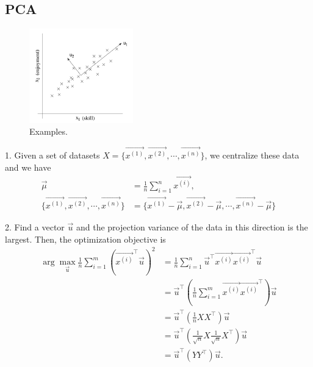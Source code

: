 \documentclass[10pt,onecolumn]{book}
\begin{document}
\subsection{PCA}
\begin{figure}[h]
\centering
\includegraphics[width=0.4\textwidth]{figures/pca_variance.png}
\caption{Examples.}
\end{figure}

1. Given a set of datasets $X = \{\overrightarrow{x^{(1)}}, \overrightarrow{x^{(2)}}, \cdots, \overrightarrow{x^{(n)}} \}$, we centralize these data and we have
\begin{equation}
\begin{split}
\overrightarrow{\mu} &= \frac{1}{n} \sum_{i=1}^n \overrightarrow{x^{(i)}}, \\
\{\overrightarrow{x^{(1)}}, \overrightarrow{x^{(2)}}, \cdots, \overrightarrow{x^{(n)}} \} &= \{\overrightarrow{x^{(1)}} - \overrightarrow{\mu}, \overrightarrow{x^{(2)}} - \overrightarrow{\mu}, \cdots, \overrightarrow{x^{(n)}}-\overrightarrow{\mu} \}
\end{split}
\end{equation}

2. Find a vector $\vec{u}$ and the projection variance of the data in this direction is the largest. Then, the optimization objective is
\begin{equation}
\begin{split}
\arg \max_{\vec{u}} \frac{1}{n}\sum_{i=1}^m (\overrightarrow{x^{(i)}}^\top \vec{u})^2 &= \frac{1}{n} \sum_{i=1}^n \vec{u}^\top \overrightarrow{x^{(i)}} \overrightarrow{x^{(i)}}^\top \vec{u} \\
&= \vec{u}^\top \left(\frac{1}{n}\sum_{i=1}^m \overrightarrow{x^{(i)}} \overrightarrow{x^{(i)}}^\top \right) \vec{u} \\
&= \vec{u}^\top \left(\frac{1}{n} XX^\top \right) \vec{u} \\
&= \vec{u}^\top \left(\frac{1}{\sqrt{n}} X \frac{1}{\sqrt{n}}X^\top \right)\vec{u} \\
&= \vec{u}^\top \left(Y Y^\top \right)\vec{u}.
\end{split}
\end{equation}
\end{document}
